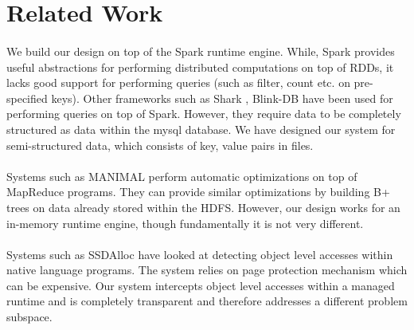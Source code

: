 \section{Related Work}
\label{sec:related}
\paragraph{}
We build our design on top of the Spark\cite{zaharia2012resilient} runtime engine. While, Spark provides useful abstractions for performing distributed computations on top of RDDs, it lacks good support for performing queries (such as filter, count etc. on pre-specified keys). Other frameworks such as Shark \cite{engle2012shark}, Blink-DB \cite{agarwal2013blinkdb} have been used for performing queries on top of Spark. However, they require data to be completely structured as data within the mysql database. We have designed our system for semi-structured data, which consists of key, value pairs in files. 
\paragraph{}
Systems such as MANIMAL \cite{jahani2011automatic} perform automatic optimizations on top of MapReduce programs. They can provide similar optimizations by building B+ trees on data already stored within the HDFS. However, our design works for an in-memory runtime engine, though fundamentally it is not very different.
\paragraph{}
Systems such as SSDAlloc\cite{badam2011ssdalloc} have looked at detecting object level accesses within native language programs. The system relies on page protection mechanism which can be expensive. Our system intercepts object level accesses within a managed runtime and is completely transparent and therefore addresses a different problem subspace.